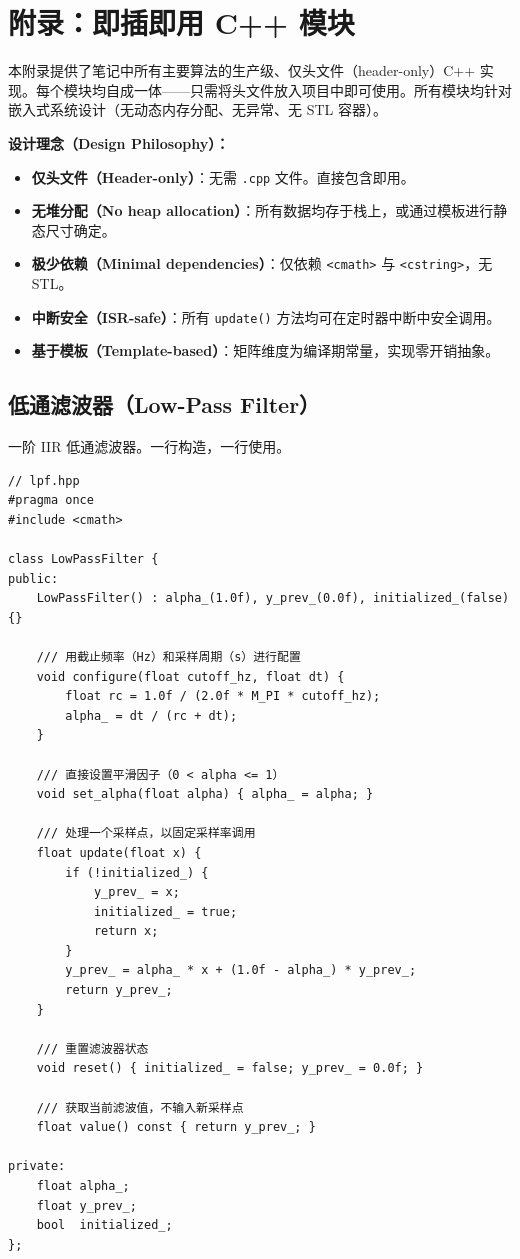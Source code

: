 \section{附录：即插即用 C++ 模块}

本附录提供了笔记中所有主要算法的生产级、仅头文件（header-only）C++ 实现。每个模块均自成一体——只需将头文件放入项目中即可使用。所有模块均针对嵌入式系统设计（无动态内存分配、无异常、无 STL 容器）。

\textbf{设计理念（Design Philosophy）：}
\begin{itemize}
    \item \textbf{仅头文件（Header-only）}：无需 \texttt{.cpp} 文件。直接包含即用。
    \item \textbf{无堆分配（No heap allocation）}：所有数据均存于栈上，或通过模板进行静态尺寸确定。
    \item \textbf{极少依赖（Minimal dependencies）}：仅依赖 \texttt{<cmath>} 与 \texttt{<cstring>}，无 STL。
    \item \textbf{中断安全（ISR-safe）}：所有 \texttt{update()} 方法均可在定时器中断中安全调用。
    \item \textbf{基于模板（Template-based）}：矩阵维度为编译期常量，实现零开销抽象。
\end{itemize}

\subsection{低通滤波器（Low-Pass Filter）}

一阶 IIR 低通滤波器。一行构造，一行使用。

\begin{verbatim}
// lpf.hpp
#pragma once
#include <cmath>

class LowPassFilter {
public:
    LowPassFilter() : alpha_(1.0f), y_prev_(0.0f), initialized_(false) {}

    /// 用截止频率（Hz）和采样周期（s）进行配置
    void configure(float cutoff_hz, float dt) {
        float rc = 1.0f / (2.0f * M_PI * cutoff_hz);
        alpha_ = dt / (rc + dt);
    }

    /// 直接设置平滑因子（0 < alpha <= 1）
    void set_alpha(float alpha) { alpha_ = alpha; }

    /// 处理一个采样点，以固定采样率调用
    float update(float x) {
        if (!initialized_) {
            y_prev_ = x;
            initialized_ = true;
            return x;
        }
        y_prev_ = alpha_ * x + (1.0f - alpha_) * y_prev_;
        return y_prev_;
    }

    /// 重置滤波器状态
    void reset() { initialized_ = false; y_prev_ = 0.0f; }

    /// 获取当前滤波值，不输入新采样点
    float value() const { return y_prev_; }

private:
    float alpha_;
    float y_prev_;
    bool  initialized_;
};
\end{verbatim}


